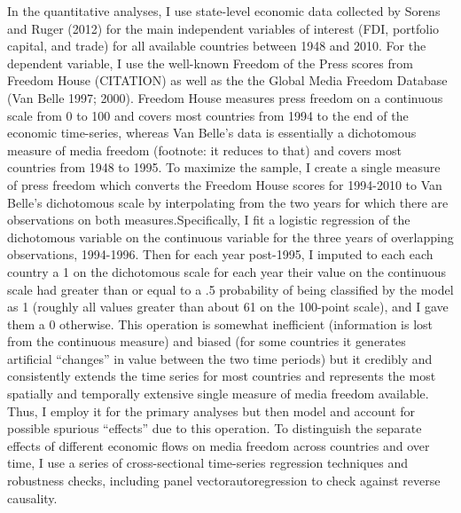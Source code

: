 \documentclass[a4paper]{article}\usepackage[]{graphicx}\usepackage[]{color}
\begin{document}
In the quantitative analyses, I use state-level economic data collected by Sorens and Ruger (2012) for the main independent variables of interest (FDI, portfolio capital, and trade) for all available countries between 1948 and 2010. For the dependent variable, I use the well-known Freedom of the Press scores from Freedom House (CITATION) as well as the the Global Media Freedom Database (Van Belle 1997; 2000). Freedom House measures press freedom on a continuous scale from 0 to 100 and covers most countries from 1994 to the end of the economic time-series, whereas Van Belle's data is essentially a dichotomous measure of media freedom (footnote: it reduces to that) and covers most countries from 1948 to 1995. To maximize the sample, I create a single measure of press freedom which converts the Freedom House scores for 1994-2010 to Van Belle's dichotomous scale by interpolating from the two years for which there are observations on both measures.Specifically, I fit a logistic regression of the dichotomous variable on the continuous variable for the three years of overlapping observations, 1994-1996. Then for each year post-1995, I imputed to each each country a 1 on the dichotomous scale for each year their value on the continuous scale had greater than or equal to a .5 probability of being classified by the model as 1 (roughly all values greater than about 61 on the 100-point scale), and I gave them a 0 otherwise. This operation is somewhat inefficient (information is lost from the continuous measure) and biased (for some countries it generates artificial “changes” in value between the two time periods) but it credibly and consistently extends the time series for most countries and represents the most spatially and temporally extensive single measure of media freedom available. Thus, I employ it for the primary analyses but then model and account for possible spurious “effects” due to this operation. To distinguish the separate effects of different economic flows on media freedom across countries and over time, I use a series of cross-sectional time-series regression techniques and robustness checks, including panel vectorautoregression to check against reverse causality.
\end{document}
